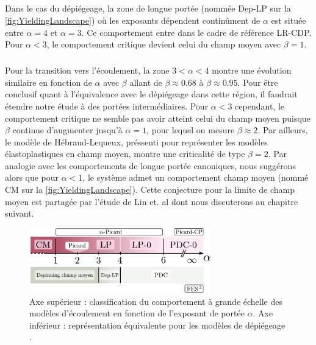 \subparagraph{}Dans le cas du dépiégeage, la zone de longue portée (nommée Dep-LP sur la \autoref{fig:YieldingLandscape}) où les exposants dépendent continûment de $\alpha$ est située entre $\alpha=4$ et $\alpha=3$. Ce comportement entre dans le cadre de référence LR-CDP. Pour $\alpha<3$, le comportement critique devient celui du champ moyen avec $\beta=1$.

\subparagraph{}Pour la transition vers l'écoulement, la zone $3<\alpha<4$ montre une évolution similaire en fonction de $\alpha$ avec $\beta$ allant de $\beta\approx 0.68$ à $\beta\approx 0.95$. Pour être conclusif quant à l'équivalence avec le dépiégeage dans cette région, il faudrait étendre notre étude à des portées intermédiaires. Pour $\alpha<3$ cependant, le comportement critique ne semble pas avoir atteint celui du champ moyen puisque $\beta$ continue d'augmenter jusqu'à $\alpha=1$, pour lequel on mesure $\beta\approx 2$. Par ailleurs, le modèle de Hébraud-Lequeux, préssenti pour représenter les modèles élastoplastiques en champ moyen, montre une criticalité de type $\beta=2$. Par analogie avec les comportements de longue portée canoniques, nous suggérons alors que pour $\alpha<1$, le système admet un comportement champ moyen (nommé CM sur la \autoref{fig:YieldingLandscape}). Cette conjecture pour la limite de champ moyen est partagée par l'étude de Lin et. al \cite{lin_mean-field_2016} dont nous discuterons au chapitre suivant.

\begin{figure}[h]
	\centering
	\includegraphics[width=0.7\textwidth]{Chapitre4/Figures/LonguePortee/axe_alpha.pdf}
	\caption{Axe supérieur : classification du comportement à grande échelle des modèles d'écoulement en fonction de l'exposant de portée $\alpha$. Axe inférieur : représentation équivalente pour les modèles de dépiégeage \cite{cao_localization_2018}.}
	\label{fig:YieldingLandscape}
\end{figure}

